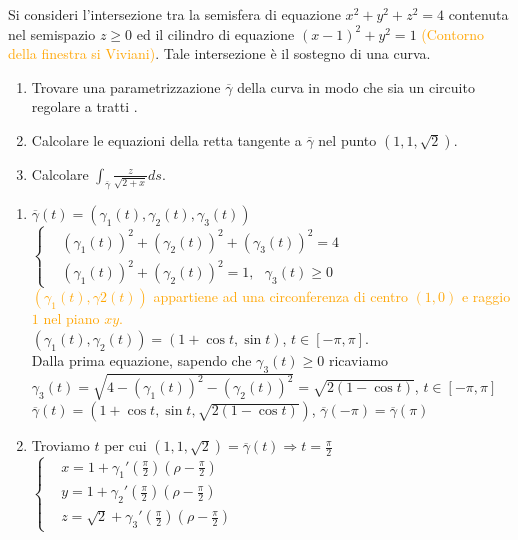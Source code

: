 \begin{exbar}
\begin{example}
	Si consideri l'intersezione tra la semisfera di equazione $x^2+y^2+z^2=4$ contenuta nel semispazio $z \geq 0$ ed il cilindro di equazione $(x-1)^2+y^2=1$ \textcolor{orange}{(Contorno della finestra si Viviani)}. Tale intersezione è il sostegno di una curva.
	\begin{enumerate}
		\item Trovare una parametrizzazione $\overline{\gamma}$ della curva in modo che sia un circuito regolare a tratti .
		\item Calcolare le equazioni della retta tangente a $\overline{\gamma}$ nel punto $(1,1,\sqrt{2})$.
		\item Calcolare $\int_{\overline{\gamma}}\frac{z}{\sqrt{2+x}}ds$.
	\end{enumerate}
	\begin{enumerate}
		\item $\overline{\gamma}(t) =(\gamma_1(t), \gamma_2(t), \gamma_3(t))$\\
		$\begin{cases}
			&(\gamma_1(t))^2+(\gamma_2(t))^2+(\gamma_3 (t))^2=4\\
			&(\gamma_1(t))^2+(\gamma_2(t))^2=1,\,\,\,\, \gamma_3(t)\geq 0
		\end{cases}$\\
		\textcolor{orange}{$(\gamma_1 (t),\gamma2(t))$ appartiene ad una circonferenza di centro $(1,0)$ e raggio $1$ nel piano $xy$.}\\
		$(\gamma_1(t),\gamma_2(t))=(1+\cos t , \sin t)$, $t \in [-\pi, \pi]$.\\
		Dalla prima equazione, sapendo che $\gamma_3(t)\geq 0$ ricaviamo \\
		$\gamma_3 (t)=\sqrt{4-(\gamma_1(t))^2-(\gamma_2(t))^2}=\sqrt{2(1-\cos t)}$, $ t \in [-\pi,\pi]$\\
		$\overline{\gamma}(t)= (1+\cos t, \sin t, \sqrt{2(1-\cos t)})$, $\overline{\gamma} (-\pi) = \overline{\gamma}(\pi)$
		\item Troviamo $t$ per cui $(1,1,\sqrt{2})=\overline{\gamma}(t) \Rightarrow t = \frac{\pi}{2}$\\
		$\begin{cases}
			& x= 1+\gamma_1' (\frac{\pi}{2})(\rho -\frac{\pi}{2})\\
			& y= 1+\gamma_2' (\frac{\pi}{2})(\rho -\frac{\pi}{2})\\
			& z= \sqrt{2} + \gamma_3' (\frac{\pi}{2})(\rho - \frac{\pi}{2})
		\end{cases}$\\

\end{enumerate}
\end{example}
\end{exbar}
